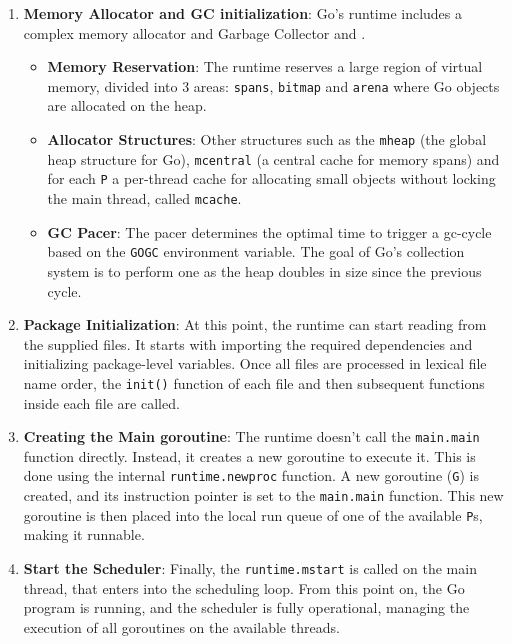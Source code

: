 \begin{enumerate}
    \item \textbf{Memory Allocator and \gls{GC} initialization}: Go's runtime includes a complex memory allocator and Garbage Collector \cite{go:memory-distribution} and \cite{go:memory-internals}.
    \begin{itemize}
        \item \textbf{Memory Reservation}: The runtime reserves a large region of virtual memory, divided into 3 areas: \texttt{spans}, \texttt{bitmap} and \texttt{arena} where Go objects are allocated on the heap.
        \item \textbf{Allocator Structures}: Other structures such as the \texttt{mheap} (the global heap structure for Go), \texttt{mcentral} (a central cache for memory spans) and for each \texttt{P} a per-thread cache for allocating small objects without locking the main thread, called \texttt{mcache}.
        \item \textbf{\gls{GC} Pacer}: The pacer determines the optimal time to trigger a \gls{gc-cycle} based on the \texttt{GOGC} environment variable. The goal of Go's collection system is to perform one as the heap doubles in size since the previous cycle.
    \end{itemize}

    \item \textbf{Package Initialization}: At this point, the runtime can start reading from the supplied files. It starts with importing the required dependencies and initializing package-level variables. Once all files are processed in lexical file name order, the \texttt{init()} function of each file and then subsequent functions inside each file are called.

    \item \textbf{Creating the Main \Gls{goroutine}}: The runtime doesn't call the \texttt{main.main} function directly. Instead, it creates a new \gls{goroutine} to execute it. This is done using the internal \texttt{runtime.newproc} function. A new \gls{goroutine} (\texttt{G}) is created, and its instruction pointer is set to the \texttt{main.main} function. This new \gls{goroutine} is then placed into the local run queue of one of the available \texttt{P}s, making it runnable.
        
    \item \textbf{Start the Scheduler}: Finally, the \texttt{runtime.mstart} is called on the main thread, that enters into the scheduling loop. From this point on, the Go program is running, and the scheduler is fully operational, managing the execution of all goroutines on the available threads.
        
\end{enumerate}



